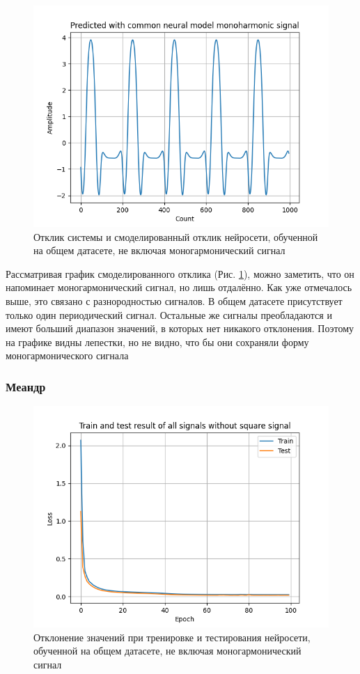 \begin{figure}[H]
	\centering
	\includegraphics[width=0.6\linewidth]{body/images/Predicted-with-common-neural-model-monoharmonic-signal.png}
	\caption{Отклик системы и смоделированный отклик нейросети, обученной на общем датасете, не включая моногармонический сигнал}
	\label{fig:28}
\end{figure}

Рассматривая график смоделированного отклика (Рис. \ref{fig:28}), можно заметить, что он напоминает моногармонический сигнал, но лишь отдалённо. Как уже отмечалось выше,
это связано с разнородностью сигналов. В общем датасете присутствует только один периодический сигнал. Остальные же сигналы преобладаются и имеют больший диапазон
значений, в которых нет никакого отклонения. Поэтому на графике видны лепестки, но не видно, что бы они сохраняли форму моногармонического сигнала

\subsubsection{Меандр}

\begin{figure}[H]
	\centering
	\includegraphics[width=0.6\linewidth]{body/images/Train-and-test-result-of-all-signals-without-square-signal.png}
	\caption{Отклонение значений при тренировке и тестирования нейросети, обученной на общем датасете, не включая моногармонический сигнал}
	\label{fig:29}
\end{figure}


